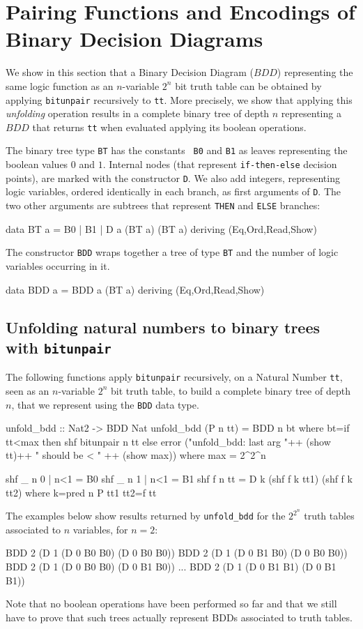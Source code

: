 \documentclass[]{INCLUDES/llncs}
\begin{document}
\section{Pairing Functions and Encodings of Binary Decision Diagrams}
\label{encbdd}

We show in this section that a Binary Decision Diagram ($BDD$)
representing the same logic function as an $n$-variable $2^n$ bit truth
table can be obtained by applying {\tt bitunpair} recursively to {\tt tt}.
More precisely, we show that applying this {\em unfolding} operation
results in a complete binary tree of depth $n$ representing
a $BDD$ that returns {\tt tt} when evaluated applying
its boolean operations.

The binary tree type {\tt BT} has the constants {\tt
B0} and {\tt B1} as leaves representing the boolean values $0$ and $1$.
Internal nodes (that represent {\tt if-then-else} decision points), 
are marked with the constructor {\tt D}. 
We also add integers, representing logic
variables, ordered identically in each
branch, as first arguments of {\tt D}. 
The two other arguments are subtrees 
that represent {\tt THEN} 
and {\tt ELSE} branches:
\begin{code}
data BT a = B0 | B1 | D a (BT a) (BT a) deriving (Eq,Ord,Read,Show)
\end{code}

The constructor {\tt BDD} wraps together a 
tree of type {\tt BT} and the number of logic
variables occurring in it.
\begin{code}
data BDD a = BDD a (BT a) deriving (Eq,Ord,Read,Show)
\end{code}

\subsection{Unfolding natural numbers to binary trees with {\tt bitunpair}}
The following functions apply {\tt bitunpair} recursively, 
on a Natural Number {\tt tt}, 
seen as an $n$-variable $2^n$ bit truth table, 
to build a complete binary tree of depth $n$, 
that we represent using the {\tt BDD} data type. 
\begin{code}
unfold_bdd :: Nat2 -> BDD Nat
unfold_bdd (P n tt) = BDD n bt where 
  bt=if tt<max then shf bitunpair n tt
     else error 
       ("unfold_bdd: last arg "++ (show tt)++
       " should be < " ++ (show max))
     where max = 2^2^n

  shf _ n 0 | n<1 =  B0
  shf _ n 1 | n<1 =  B1
  shf f n tt = D k (shf f k tt1) (shf f k tt2) where
    k=pred n
    P tt1 tt2=f tt
\end{code}
The examples below
show results returned by {\tt unfold\_bdd} 
for the $2^{2^n}$ truth tables associated to $n$ variables,
for $n=2$:
\begin{codex}
 BDD 2 (D 1 (D 0 B0 B0) (D 0 B0 B0))
 BDD 2 (D 1 (D 0 B1 B0) (D 0 B0 B0))
 BDD 2 (D 1 (D 0 B0 B0) (D 0 B1 B0))
 ...
 BDD 2 (D 1 (D 0 B1 B1) (D 0 B1 B1))
\end{codex}
Note that no boolean operations have been performed so far
and that we still have to prove that such
trees actually represent BDDs associated to truth tables.
\end{document}
